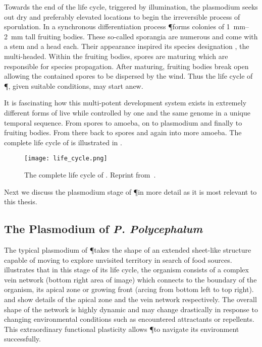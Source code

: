 		Towards the end of the life cycle, triggered by illumination, the plasmodium seeks out dry and preferably elevated locations to begin the irreversible process of sporulation. In a synchronous differentiation process \P forms colonies of \SIrange{1}{2}{\milli\metre} tall fruiting bodies. These so-called sporangia are numerous and come with a stem and a head each. Their appearance inspired its species designation \Pp, the multi-headed. Within the fruiting bodies, spores are maturing which are responsible for species propagation. After maturing, fruiting bodies break open allowing the contained spores to be dispersed by the wind. Thus the life cycle of \P, given suitable conditions, may start anew.

		It is fascinating how this multi-potent development system exists in extremely different forms of live while controlled by one and the same genome in a unique temporal sequence. From spores to amoeba, on to plasmodium and finally to fruiting bodies. From there back to spores and again into more amoeba. The complete life cycle of \Pp is illustrated in .

		\begin{figure}[htb]
			\centering
			\texttt{[image: life\_cycle.png]}
			\caption[Life cycle of \P]{The complete life cycle of \Pp. Reprint from~\cite{Sauer1986}.}
			\label{fig:life_cycle}
		\end{figure}

		Next we discuss the plasmodium stage of \P in more detail as it is most relevant to this thesis.

		\FloatBarrier

	\subsection{The Plasmodium of \textit{P. Polycephalum}}

		The typical plasmodium of \P takes the shape of an extended sheet-like structure capable of moving to explore unvisited territory in search of food sources.  illustrates that in this stage of its life cycle, the organism consists of a complex vein network (bottom right area of image) which connects to the boundary of the organism, its apical zone or growing front (arcing from bottom left to top right).  and  show details of the apical zone and the vein network respectively. The overall shape of the network is highly dynamic and may change drastically in response to changing environmental conditions such as encountered attractants or repellents. This extraordinary functional plasticity allows \P to navigate its environment successfully.


